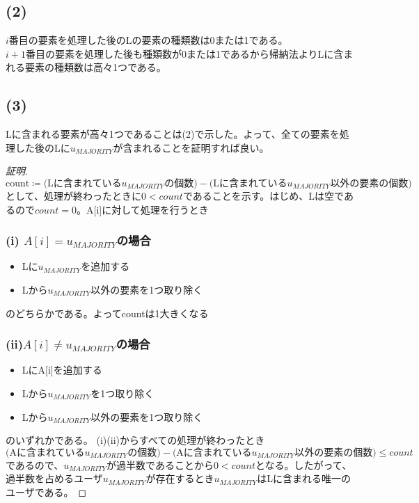 \documentclass[a4paper,12pt,xelatex,ja=standard]{bxjsarticle}
\begin{document}
\subsection*{(2)}
$i$番目の要素を処理した後のLの要素の種類数は0または1である。\\
$i+1$番目の要素を処理した後も種類数が0または1であるから帰納法よりLに含まれる要素の種類数は高々1つである。

\subsection*{(3)}
Lに含まれる要素が高々1つであることは(2)で示した。よって、全ての要素を処理した後のLに$u_{MAJORITY}$が含まれることを証明すれば良い。\\
\begin{proof}[証明]
  \[
    \text{count} \coloneqq \text{(Lに含まれている$u_{MAJORITY}$の個数)} - \text{(Lに含まれている$u_{MAJORITY}$以外の要素の個数)}
  \]
  として、処理が終わったときに$0 < count$であることを示す。はじめ、Lは空であるので$count = 0$。A[i]に対して処理を行うとき\\
  \subsubsection*{(i) $A[i] = u_{MAJORITY}$の場合}
  \begin{itemize}
    \item Lに$u_{MAJORITY}$を追加する
    \item Lから$u_{MAJORITY}$以外の要素を1つ取り除く
  \end{itemize}
  のどちらかである。よってcountは1大きくなる
  \subsubsection*{(ii)$A[i] \neq u_{MAJORITY}$の場合}
  \begin{itemize}
    \item LにA[i]を追加する
    \item Lから$u_{MAJORITY}$を1つ取り除く
    \item Lから$u_{MAJORITY}$以外の要素を1つ取り除く
  \end{itemize}
  のいずれかである。
  (i)(ii)からすべての処理が終わったとき
  \[
    \text{(Aに含まれている$u_{MAJORITY}$の個数)} - \text{(Aに含まれている$u_{MAJORITY}$以外の要素の個数)} \leq count
  \]
  であるので、$u_{MAJORITY}$が過半数であることから$0 < count$となる。したがって、過半数を占めるユーザ$u_{MAJORITY}$が存在するとき$u_{MAJORITY}$はLに含まれる唯一のユーザである。
\end{proof}
\end{document}
